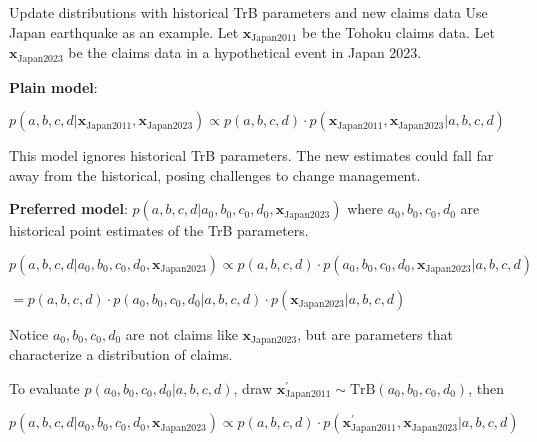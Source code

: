 \documentclass[aspectratio=169]{beamer}
\begin{document}
\begin{frame}{ Update distributions with historical TrB parameters and new claims data }
\scriptsize Use Japan earthquake as an example. Let $\boldsymbol{x}_{\text{Japan2011}}$ be the Tohoku claims data. Let $\boldsymbol{x}_{\text{Japan2023}}$ be the claims data in a hypothetical event in Japan 2023.\medskip%

\scriptsize \textbf{Plain model}:
\scriptsize \begin{center}
$p(a,b,c,d|\boldsymbol{x}_{\text{Japan2011}}, \boldsymbol{x}_{\text{Japan2023}} )  \propto   p(a,b,c,d)\cdot p(\boldsymbol{x}_{\text{Japan2011}}, \boldsymbol{x}_{\text{Japan2023}} | a, b, c,d )$
\end{center}

\scriptsize This model ignores historical TrB parameters. The new estimates could fall far away from the historical, posing challenges to change management.\medskip%

\scriptsize \textbf{Preferred model}: $p(a,b,c,d|a_0,b_0,c_0,d_0,\boldsymbol{x}_{\text{Japan2023}})$ where $a_0,b_0,c_0,d_0$ are historical point estimates of the TrB parameters.
\scriptsize\begin{center}
$p(a,b,c,d|a_0,b_0,c_0,d_0, \boldsymbol{x}_{\text{Japan2023}} )  \propto   p(a,b,c,d)\cdot p(a_0,b_0,c_0,d_0, \boldsymbol{x}_{\text{Japan2023}} | a, b, c, d )$\smallskip

$= p(a,b,c,d)\cdot p(a_0,b_0,c_0,d_0|a, b, c, d)\cdot p( \boldsymbol{x}_{\text{Japan2023}} | a, b, c, d )$
\end{center}%

\scriptsize Notice $a_0,b_0,c_0,d_0$ are not claims like $\boldsymbol{x}_{\text{Japan2023}}$, but are parameters that characterize a distribution of claims.\medskip%

\scriptsize To evaluate $p(a_0,b_0,c_0,d_0|a,b,c,d)$, draw $\boldsymbol{x}_{\text{Japan2011}}^\prime\sim\text{TrB}(a_0, b_0, c_0, d_0)$, then
\begin{center}
$p(a,b,c,d|a_0, b_0, c_0, d_0, \boldsymbol{x}_{\text{Japan2023}} )  \propto   p(a,b,c,d)\cdot p(\boldsymbol{x}_{\text{Japan2011}}^\prime, \boldsymbol{x}_{\text{Japan2023}} | a, b, c,d )$
\end{center}
\end{frame}
\end{document}
